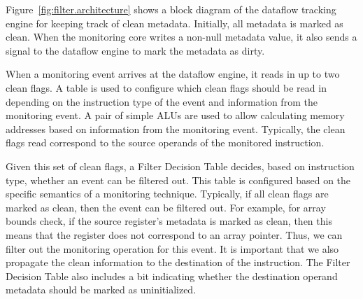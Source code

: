 Figure~\ref{fig:filter.architecture} shows a block diagram of the dataflow
tracking engine for
keeping track of clean metadata. Initially, all metadata is marked as clean.
When the monitoring core writes a non-null metadata value, it also sends a
signal to the dataflow engine to mark the metadata as dirty. 

When a monitoring event arrives at the dataflow engine,
it reads in up to two clean flags. A table is used to configure
which clean flags should be read in depending on the instruction type of
the event and information from the monitoring event. A pair of simple ALUs are
used to allow calculating memory addresses based on information from the
monitoring event. Typically, the clean flags read correspond to the
source operands of the monitored instruction.

Given this set of clean flags, a Filter Decision Table decides, based
on instruction type, whether an event can be filtered out. This table is
configured based on the specific semantics of a monitoring technique.
Typically, if all clean flags are marked as clean, then the
event can be filtered out. For example, for array bounds check, if the source
register's metadata is marked as clean, then this means that the
register does not correspond to an array pointer. Thus, we can filter out the
monitoring operation for this event. 
It is important that we also propagate the clean information to the destination
of the instruction.  The Filter Decision Table also includes a bit indicating
whether the destination operand metadata should be marked as uninitialized.
